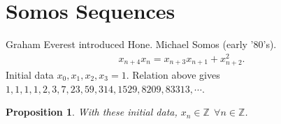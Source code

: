 \documentclass[12pt,reqno]{amsart}
\numberwithin{equation}{section}  %
\newcommand{\zz}{\mathbb{Z}}
\newtheorem{proposition}[theorem]{Proposition}
\begin{document}
\section{Somos Sequences} 
\label{sec:somos}
Graham Everest introduced Hone. Michael Somos (early '80's). 
%
%
\begin{equation*}
\begin{split}
  x_{n+4}x_{n} = x_{n+3}x_{n+1} + x_{n+2}^{2}.
\end{split}
\end{equation*}
%
%
Initial data $x_{0}, x_{1}, x_{2}, x_{3} =1$. Relation above gives
\\ $1,1,1,1,2,3,7,23,59,314,1529,8209,83313,\cdots$. 
%
%
%
%
%
%                
%
%
%
%
\begin{proposition}
  With these initial data, $x_{n} \in \zz \ \ \forall n \in \zz$. 
\label{prop:somos}
\end{proposition}
%
%
\end{document}
